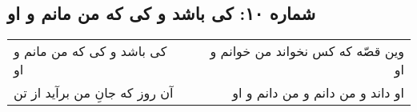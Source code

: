 \begin{center}
\section*{شماره ۱۰: کی باشد و کی که من مانم و او}
\label{sec:010}
\begin{longtable}{l p{0.5cm} r}
کی باشد و کی که من مانم و او
&&
وین قصّه که کس نخواند من خوانم و او
\\
آن روز که جانِ من برآید از تن
&&
او داند و من دانم و من دانم و او
\\
\end{longtable}
\end{center}
